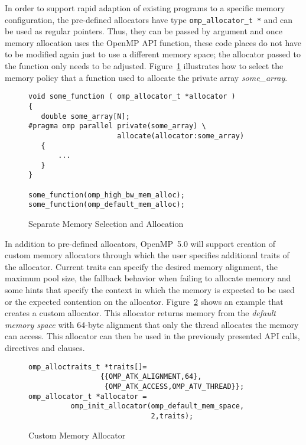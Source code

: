 In order to support rapid adaption of existing programs to a specific memory 
configuration, the pre-defined allocators have type 
\texttt{omp\_allocator\_t *} and can be used as regular pointers. Thus, they 
can be passed by argument and once memory allocation uses the OpenMP API 
function, these code places do not have to be modified again just to use a 
different memory space; the allocator passed to the function only needs to 
be adjusted. Figure~\ref{fig:separation-concerns-alloc} illustrates how to
select the memory policy that a function used to allocate the private array 
\emph{some\_array}.


\begin{figure}[t]
\begin{verbatim}
void some_function ( omp_allocator_t *allocator )
{
   double some_array[N];
#pragma omp parallel private(some_array) \
                     allocate(allocator:some_array)
   {
       ...
   }
}

some_function(omp_high_bw_mem_alloc);
some_function(omp_default_mem_alloc);
\end{verbatim}
\caption{Separate Memory Selection and Allocation\label{fig:separation-concerns-alloc}}
\end{figure}

In addition to pre-defined allocators, OpenMP~5.0 will support creation of 
custom memory allocators through which the user specifies additional traits 
of the allocator. Current traits can specify the desired memory alignment, 
the maximum pool size, the fallback behavior when failing to allocate memory 
and some hints that specify the context in which the memory is expected to be
used or the expected contention on the allocator. 
Figure~\ref{fig:custom-allocator} shows an example that creates a custom 
allocator. This allocator returns memory from the \emph{default memory space} 
with 64-byte alignment that only the thread allocates the memory can access.
This allocator can then be used in the previously presented API calls, 
directives and clauses.

\begin{figure}[t]
\begin{verbatim}
omp_alloctraits_t *traits[]=
                 {{OMP_ATK_ALIGNMENT,64},
                  {OMP_ATK_ACCESS,OMP_ATV_THREAD}};
omp_allocator_t *allocator = 
          omp_init_allocator(omp_default_mem_space,
                             2,traits);
\end{verbatim}
\caption{Custom Memory Allocator\label{fig:custom-allocator}}
\end{figure}


